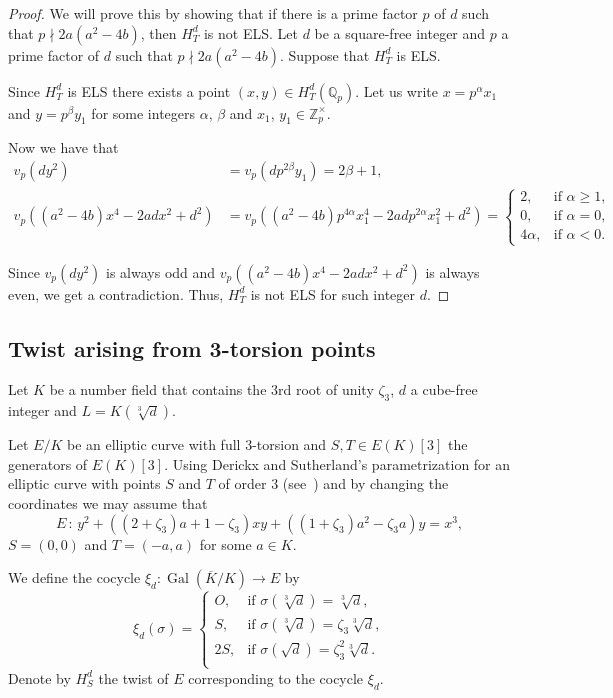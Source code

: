 \documentclass[a4paper, 12pt]{amsart}
\theoremstyle{definition}
\theoremstyle{remark}
\newcommand{\GalK}{\operatorname{Gal}(\overline{K}/K)}
\newcommand{\whichbold}[1]{\mathbb{#1}} %
\newcommand{\Z}{\whichbold{Z}}
\newcommand{\Qp}{\whichbold{Q}_{p}}
\numberwithin{equation}{section}
\begin{document}
\begin{proof}
    We will prove this by showing that if there is a prime factor $p$ of $d$ such that ${p \nmid 2a(a^2-4b)}$, then $H^d_T$ is not ELS. 
    Let $d$ be a square-free integer and $p$ a prime factor of $d$ such that $p \nmid 2a(a^2-4b)$. Suppose that $H^d_T$ is ELS. 
    
    Since $H^d_T$ is ELS there exists a point $(x,y)\in H_T^d(\Qp)$. Let us write $x=p^\alpha x_1$ and $y=p^\beta y_1$ for some integers $\alpha$, $\beta$ and $x_1$, $y_1 \in \Z_p^\times$.

    Now we have that 
    \begin{align*}
        v_p(dy^2)&= v_p(dp^{2\beta}y_1)=2\beta+1,\\
        v_p((a^2-4b)x^4-2adx^2+d^2)&=v_p((a^2-4b)p^{4\alpha}x_1^4-2adp^{2\alpha}x_1^2+d^2)=
        \begin{cases}
            2, & \text{if } \alpha \geq 1, \\
            0, & \text{if } \alpha =0, \\
            4\alpha , & \text{if } \alpha < 0.
        \end{cases}
    \end{align*}

    Since $v_p(dy^2)$ is always odd and $v_p((a^2-4b)x^4-2adx^2+d^2)$ is always even, we get a contradiction. Thus, $H^d_T$ is not ELS for such integer $d$.
\end{proof}


\subsection{Twist arising from 3-torsion points}\label{sec:2.2}

Let $K$ be a number field that contains the $3$rd root of unity $\zeta_3$, $d$ a cube-free integer and $L=K(\sqrt[3]{d})$.

Let $E/K$ be an elliptic curve with full $3$-torsion  and $S,T \in E(K)[3]$ the generators of $E(K)[3]$. 
Using Derickx and Sutherland's parametrization for an elliptic curve with points $S$ and $T$ of order $3$ (see~\cite{Derickx_2017}) and by changing the coordinates we may assume that
\[
    E\, : \, y^2+((2+\zeta_3)a+1-\zeta_3)xy+((1+\zeta_3)a^2-\zeta_3 a)y=x^3,
\]
$S=(0,0)$ and $T=(-a,a)$ for some $a \in K$.

We define the cocycle $\xi_d : \GalK \to E$ by
\[
    \xi_d (\sigma)=
    \begin{cases}
        O, & \text{if } \sigma(\sqrt[3]{d})=\sqrt[3]{d}, \\
        S, & \text{if } \sigma(\sqrt[3]{d})=\zeta_3\sqrt[3]{d},\\
        2S, & \text{if } \sigma(\sqrt{d})=\zeta_3^2\sqrt[3]{d}.\\
    \end{cases}
\]
Denote by $H_S^d$ the twist of $E$ corresponding to the cocycle $\xi_d$.
\end{document}
